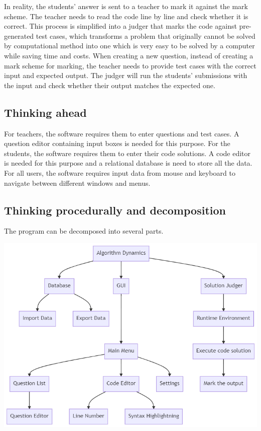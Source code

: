 \documentclass[a4paper]{report}
\begin{document}
In reality, the students' answer is sent to a teacher to mark it against the mark scheme. The teacher needs to read the code line by line and check whether it is correct. This process is simplified into a judger that marks the code against pre-generated test cases, which transforms a problem that originally cannot be solved by computational method into one which is very easy to be solved by a computer while saving time and costs. When creating a new question, instead of creating a mark scheme for marking, the teacher needs to provide test cases with the correct input and expected output. The judger will run the students' submissions with the input and check whether their output matches the expected one.

\subsection{Thinking ahead}

For teachers, the software requires them to enter questions and test cases. A question editor containing input boxes is needed for this purpose. For the students, the software requires them to enter their code solutions. A code editor is needed for this purpose and a relational database is need to store all the data. For all users, the software requires input data from mouse and keyboard to navigate between different windows and menus. 

\subsection{Thinking procedurally and decomposition}

The program can be decomposed into several parts.

\includegraphics[width=\linewidth]{decomposition-diagram}
\end{document}
